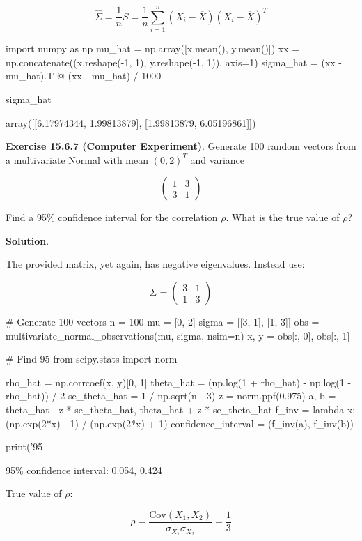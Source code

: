 \[ \hat{\Sigma} = \frac{1}{n} S = \frac{1}{n} \sum_{i=1}^{n} (X_{i} - \overline{X})(X_{i} - \overline{X})^T \]

\begin{python}
import numpy as np
mu_hat = np.array([x.mean(), y.mean()])
xx = np.concatenate((x.reshape(-1, 1), y.reshape(-1, 1)), axis=1)
sigma_hat = (xx - mu_hat).T @ (xx - mu_hat) / 1000

sigma_hat
\end{python}

\begin{console}
array([[6.17974344, 1.99813879],
       [1.99813879, 6.05196861]])
\end{console}

\textbf{Exercise 15.6.7 (Computer Experiment)}. Generate 100 random
vectors from a multivariate Normal with mean \((0, 2)^T\) and variance

\[ \begin{pmatrix}
1 & 3 \\
3 & 1
\end{pmatrix} \]

Find a 95\% confidence interval for the correlation \(\rho\). What is
the true value of \(\rho\)?

\textbf{Solution}.

The provided matrix, yet again, has negative eigenvalues. Instead
use:

\[\Sigma = \begin{pmatrix}
3 & 1 \\
1 & 3
\end{pmatrix}\]

\begin{python}
# Generate 100 vectors
n = 100
mu = [0, 2]
sigma = [[3, 1], [1, 3]]
obs = multivariate_{n}ormal_observations(mu, sigma, nsim=n)
x, y = obs[:, 0], obs[:, 1]
\end{python}

\begin{python}
# Find 95%
from scipy.stats import norm

rho_hat = np.corrcoef(x, y)[0, 1]
theta_hat = (np.log(1 + rho_hat) - np.log(1 - rho_hat)) / 2
se_theta_hat = 1 / np.sqrt(n - 3)
z = norm.ppf(0.975)
a, b = theta_hat - z * se_theta_hat, theta_hat + z * se_theta_hat
f_{i}nv = lambda x: (np.exp(2*x) - 1) / (np.exp(2*x) + 1)
confidence_{i}nterval = (f_{i}nv(a), f_{i}nv(b))

print('95%
\end{python}


\begin{console}
95\% confidence interval: 0.054, 0.424
\end{console}

True value of \(\rho\):

\[ \rho = \frac{\text{Cov}(X_{1}, X_{2})}{\sigma_{X_{1}} \sigma_{X_{2}}} = \frac{1}{3}\]
